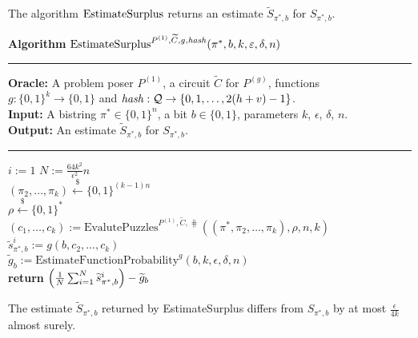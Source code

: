 The algorithm $\operatorname{\text{EstimateSurplus}}$ returns an estimate $\widetilde{S}_{\pi^*, b}$ for $S_{\pi^*, b}$.
%
\begin{codeblock}
  \textbf{Algorithm} $\operatorname{\text{EstimateSurplus}}^{P^{(1)}, \widetilde{C}, g, \operatorname{\mathit{hash}}}(\pi^*, b, k, \varepsilon, \delta, n)$
  \medskip\hrule
  \textbf{Oracle:} A problem poser $P^{(1)}$, a circuit $\widetilde{C}$ for $P^{(g)}$, functions \\
  \IndII $g: \{0,1\}^{k} \rightarrow \{0,1\}$ and  $\operatorname{\mathit{hash}} : \mathcal{Q} \rightarrow \{0,1,\dots, 2(h+v)-1\}$.\\
  \textbf{Input:} A bistring $\pi^* \in \{0,1\}^{n}$, a bit $b \in \{0,1\}$, parameters $k$, $\epsilon$, $\delta$, $n$.\\
  \textbf{Output:} An estimate $\widetilde{S}_{\pi^*, b}$ for $S_{\pi^*, b}$.
  \medskip\hrule
  \For $i:=1$ \To $N := \frac{64k^2}{\epsilon^2}n$ \Do \\
  \IndI $(\pi_{2}, \dots, \pi_k) \xleftarrow{\$} \{0,1\}^{(k-1)n}$\\
  \IndI $\rho \xleftarrow{\$} \{0,1\}^{*}$\\
  \IndI $(c_1, \dots, c_k) := \text{EvalutePuzzles}^{P^{(1)}, \widetilde{C}, \hash}((\pi^*, \pi_2, \dots, \pi_k), \rho, n, k)$\\
  \IndI $\widetilde{s}_{\pi^*,b}^i := g(b, c_{2}, \dots, c_k)$\\
  $\widetilde{g}_b := \text{EstimateFunctionProbability}^{g}(b, k, \epsilon, \delta, n)$ \\
  \textbf{return} $\Bigl(\frac{1}{N} \sum_{i=1}^N \widetilde{s}_{\pi^*,b}^i \Bigr) - \widetilde{g}_b$
\end{codeblock}
%
\begin{lemma}
  \label{lemma:surplus_estimate}
The estimate $\widetilde{S}_{\pi^*,b}$ returned by EstimateSurplus differs from $S_{\pi^*, b}$ by at most $\frac{\epsilon}{4k}$ almost surely.
\end{lemma}

